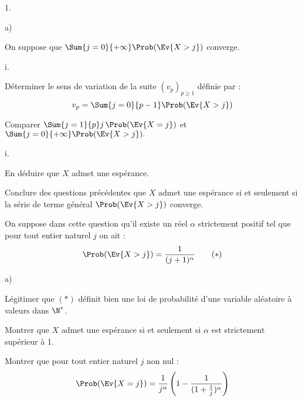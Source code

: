 \begin{noliste}{1.}
\begin{noliste}{a)}
  \item On suppose que $\Sum{j=0}{+\infty} \Prob(\Ev{X >j})$ converge.
    \begin{nonoliste}{i.}
    \item Déterminer le sens de variation de la suite $(v_p)_{p \geq
        1}$ définie par :
      \[
      v_p= \Sum{j=0}{p-1} \Prob(\Ev{X >j})
      \]
      
      

    \item Comparer $\Sum{j=1}{p} j \, \Prob(\Ev{X =j})$ et
      $\Sum{j=0}{+\infty} \Prob(\Ev{X >j}).$
    \end{nonoliste}

      

    \begin{nonoliste}{i.}
      \setcounter{enumiii}{2}
    \item En déduire que $X$ admet une espérance.

      

    \end{nonoliste}
   
  \item Conclure des questions précédentes que $X$ admet une espérance
    si et seulement si la série de terme général $\Prob(\Ev{X>j})$
    converge.

    
%     
  \end{noliste}

\item On suppose dans cette question qu'il existe un réel $\alpha$
  strictement positif tel que pour tout entier naturel $j$ on ait :
  \[
  \Prob(\Ev{X >j})= \dfrac{1}{(j+1)^{\alpha}} \qquad (\ast)
  \]
  \begin{noliste}{a)}
  \item Légitimer que $(\ast)$ définit bien une loi de probabilité d'une 
    variable aléatoire à valeurs dans $\N^*$.
    
    




  \item Montrer que $X$ admet une espérance si et seulement si $\alpha$ 
    est strictement supérieur à 1.

    

  \item Montrer que pour tout entier naturel $j$ non nul :
    \[
    \Prob(\Ev{X=j}) = \dfrac{1}{j^{\alpha}} \left( 1 -
      \dfrac{1}{(1+\frac{1}{j})^{\alpha}}\right)
    \]
    
    


\end{noliste}
\end{noliste}
